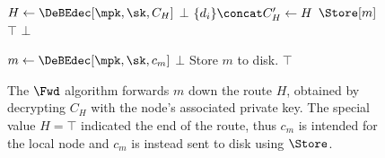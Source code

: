 
\begin{figure}[t]
  \begin{algorithmic}[1]
      \State $H\gets \DeBEdec[\mpk, \sk, C_H]$
        \State \Return $\bot$
      \EndIf
      \State $\{d_i\}\concat C_H'\gets H$
        \State \Return $\Store[m]$
      \EndIf
          \State \Return $\top$
        \EndIf
      \EndFor
      \State \Return $\bot$
    \EndFunction
  \end{algorithmic}

  \begin{algorithmic}[1]
      \State $m\gets \DeBEdec[\mpk, \sk, c_m]$
        \State \Return $\bot$
      \EndIf
      \State Store $m$ to disk.
      \State \Return $\top$
    \EndFunction
  \end{algorithmic}
  \caption{\label{SPORFwd}%
    The \(\Fwd\) algorithm forwards \(m\) down the route \(H\), obtained 
    by decrypting \(C_H\) with the node's associated private key.
    The special value \(H = \top\) indicated the end of the route, thus \(c_m\) 
    is intended for the local node and \(c_m\) is instead sent to disk using 
    \(\Store\).%
  }
\end{figure}



